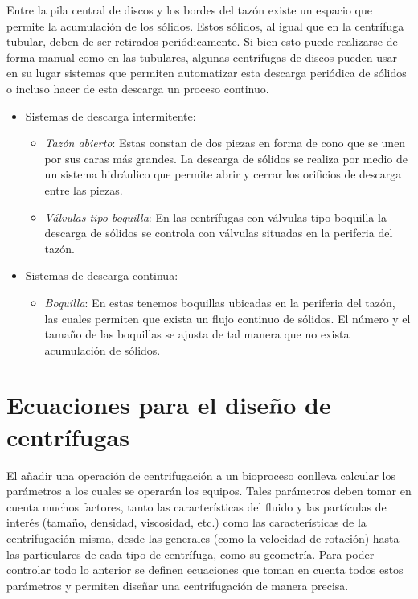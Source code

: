 \documentclass{AsignaturaResumen}
\begin{document}
Entre la pila central de discos y los bordes del tazón existe un espacio que permite la acumulación de los sólidos. Estos sólidos, al igual que en la centrífuga tubular, deben de ser retirados periódicamente. Si bien esto puede realizarse de forma manual como en las tubulares, algunas centrífugas de discos pueden usar en su lugar sistemas que permiten automatizar esta descarga periódica de sólidos o incluso hacer de esta descarga un proceso continuo.

\begin{itemize}
    \item Sistemas de descarga intermitente: \begin{itemize}
        \item \emph{Tazón abierto}: Estas constan de dos piezas en forma de cono que se unen por sus caras más grandes. La descarga de sólidos se realiza por medio de un sistema hidráulico que permite abrir y cerrar los orificios de descarga entre las piezas.
        \item \emph{Válvulas tipo boquilla}: En las centrífugas con válvulas tipo boquilla la descarga de sólidos se controla con válvulas situadas en la periferia del tazón.
    \end{itemize}
    \item Sistemas de descarga continua: \begin{itemize}
        \item \emph{Boquilla}: En estas tenemos boquillas ubicadas en la periferia del tazón, las cuales permiten que exista un flujo continuo de sólidos. El número y el tamaño de las boquillas se ajusta de tal manera que no exista acumulación de sólidos. 
    \end{itemize}
\end{itemize}  



\section{Ecuaciones para el diseño de centrífugas}

El añadir una operación de centrifugación a un bioproceso conlleva calcular los parámetros a los cuales se operarán los equipos. Tales parámetros deben tomar en cuenta muchos factores, tanto las características del fluido y las partículas de interés (tamaño, densidad, viscosidad, etc.) como las características de la centrifugación misma, desde las generales (como la velocidad de rotación) hasta las particulares de cada tipo de centrífuga, como su geometría. Para poder controlar todo lo anterior se definen ecuaciones que toman en cuenta todos estos parámetros y permiten diseñar una centrifugación de manera precisa.
\end{document}
